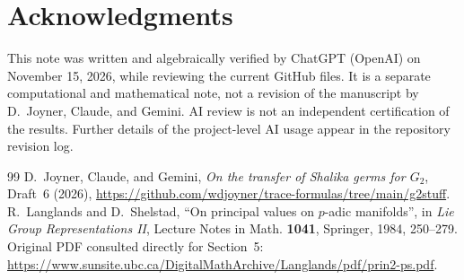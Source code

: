 \documentclass[12pt,letterpaper]{amsart}
\begin{document}
\section*{Acknowledgments}
This note was written and algebraically verified by ChatGPT (OpenAI) on November 15, 2026, while reviewing the current GitHub files. It is a separate computational and mathematical note, not a revision of the manuscript by D.~Joyner, Claude, and Gemini. AI review is not an independent certification of the results. Further details of the project-level AI usage appear in the repository revision log.

\begin{thebibliography}{99}
 D.~Joyner, Claude, and Gemini, \emph{On the transfer of Shalika germs for $G_2$}, Draft~6 (2026), \url{https://github.com/wdjoyner/trace-formulas/tree/main/g2stuff}.
 R.~Langlands and D.~Shelstad, ``On principal values on $p$-adic manifolds'', in \emph{Lie Group Representations II}, Lecture Notes in Math. \textbf{1041}, Springer, 1984, 250--279. Original PDF consulted directly for Section~5: \url{https://www.sunsite.ubc.ca/DigitalMathArchive/Langlands/pdf/prin2-ps.pdf}.
\end{thebibliography}
\end{document}
